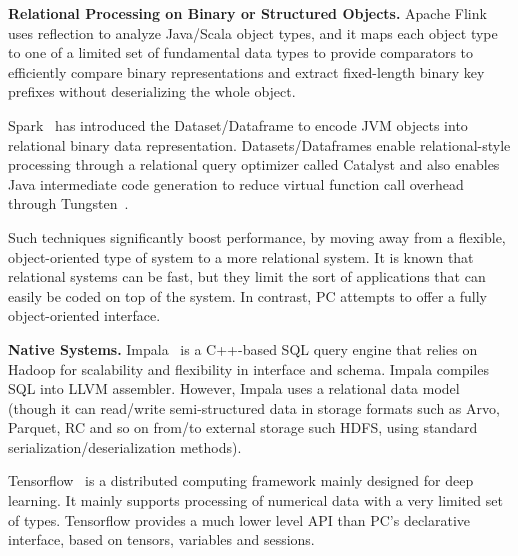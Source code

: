 \vspace{5pt}
\noindent
\textbf{Relational Processing on Binary or Structured Objects.} 
Apache Flink~\cite{alexandrov2014stratosphere} uses reflection
to analyze Java/Scala object types, and it
maps each object type to one of a limited set of
fundamental data types to provide comparators to efficiently compare binary
representations and extract fixed-length binary key prefixes without
deserializing the whole object.

Spark~\cite{tungsten} has introduced the Dataset/Dataframe 
to encode JVM objects into relational binary data representation. 
Datasets/Dataframes enable relational-style processing
through a relational query optimizer called Catalyst and
also enables Java intermediate code generation to reduce virtual
function call overhead through Tungsten~\cite{tungsten}. 

Such techniques significantly boost performance, by moving away from a flexible, object-oriented
type of system to a more relational system.
It is known that relational systems can be fast, but they limit the sort of applications that
can easily be coded on top of the system.  In contrast, PC attempts to offer a fully 
object-oriented interface.

\vspace{5pt}
\noindent
\textbf{Native Systems.} 
Impala~\cite{bittorf2015impala} is a
C++-based 
SQL query engine that relies on Hadoop for scalability and 
flexibility in interface and schema. Impala compiles SQL 
into LLVM assembler.
However,
Impala uses a relational data model (though it can read/write
semi-structured data in storage formats such as Arvo, Parquet, RC and so
on from/to external storage such HDFS, using standard
serialization/deserialization methods).

Tensorflow~\cite{abadi2016tensorflow} is a
distributed computing framework mainly designed for deep learning. It
mainly supports processing of numerical data with a
very limited set of types.
Tensorflow provides
a much lower level API than PC's declarative interface, based on tensors,
variables and sessions.


